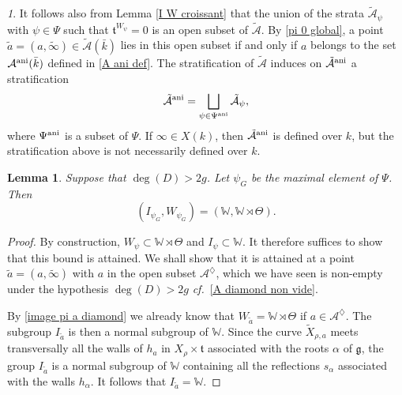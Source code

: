 \documentclass[12pt,english]{smfart}
\numberwithin{equation}{subsection}
\newtheorem{lemma}[equation]{Lemma}
\theoremstyle{remark}
\newtheorem{numero}[equation]{}
\newcommand\cf{{\it cf.\ }}
\newcommand\ani{{\rm ani}}
\begin{document}
\begin{numero}\label{ouvert ani tilde A}
It follows also from Lemma \ref{I W croissant} that the union of the strata $\tilde{\mathcal{A}}_\psi$ with $\psi\in\Psi$ such that $\mathfrak{t}^{W_\psi}=0$ is an open subset of $\tilde{\mathcal{A}}$. By \ref{pi 0 global}, a point $\tilde a=(a,\tilde\infty)\in\tilde{\mathcal{A}}(\bar k)$ lies in this open subset if and only if $a$ belongs to the set $\mathcal{A}^\ani(\bar k)$ defined in \ref{A ani def}. The stratification of $\tilde{\mathcal{A}}$ induces on $\tilde{\mathcal{A}}^\ani$ a stratification
$$\tilde{\mathcal{A}}^\ani=\bigsqcup_{\psi\in\Psi^\ani}\tilde{\mathcal{A}}_\psi,$$
where $\Psi^\ani$ is a subset of $\Psi$. If $\infty\in X(k)$, then $\tilde{\mathcal{A}}^\ani$ is defined over $k$, but the stratification above is not necessarily defined over $k$.
\end{numero}

\begin{lemma}\label{I W psi_G}
Suppose that $\deg(D)>2g$. Let $\psi_G$ be the maximal element of $\Psi$. Then
$$(I_{\psi_G},W_{\psi_G})=(\mathbb{W},\mathbb{W}\rtimes\Theta).$$
\end{lemma}

\begin{proof}
By construction, $W_\psi\subset\mathbb{W}\rtimes\Theta$ and $I_\psi\subset\mathbb{W}$. It therefore suffices to show that this bound is attained. We shall show that it is attained at a point $\tilde a=(a,\tilde\infty)$ with $a$ in the open subset $\mathcal{A}^\diamondsuit$, which we have seen is non-empty under the hypothesis $\deg(D)>2g$ \cf \ref{A diamond non vide}.

By \ref{image pi a diamond} we already know that $W_{\tilde a}=\mathbb{W}\rtimes\Theta$ if $a\in\mathcal{A}^\diamondsuit$. The subgroup $I_{\tilde a}$ is then a normal subgroup of $\mathbb{W}$. Since the curve $\widetilde X_{\rho,a}$ meets transversally all the walls of $h_a$ in $X_\rho\times\mathfrak{t}$ associated with the roots $\alpha$ of $\mathfrak{g}$, the group $I_{\tilde a}$ is a normal subgroup of $\mathbb{W}$ containing all the reflections $s_\alpha$ associated with the walls $h_\alpha$. It follows that $I_{\tilde a}=\mathbb{W}$.
\end{proof}

\end{document}
